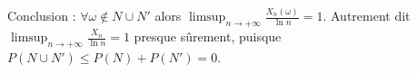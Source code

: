 {\begin{enumerate}
{Conclusion : $\forall \omega\not\in N\cup N'$ alors $\displaystyle \limsup_{n\to+\infty}
\frac{X_n(\omega)}{\ln n}=1$. Autrement dit
$\displaystyle\limsup_{n\to+\infty}\frac{X_n}{\ln n}=1$ presque sûrement, puisque
$P(N\cup N')\leq P(N)+P(N')=0$.}
\end{enumerate}
}
